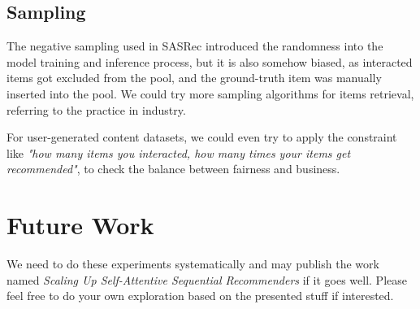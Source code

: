 \documentclass{article}
\begin{document}




\subsection{Sampling}

The negative sampling used in SASRec introduced the randomness into the model training and inference process,
but it is also somehow biased,
as interacted items got excluded from the pool,
and the ground-truth item was manually inserted into the pool.
We could try more sampling algorithms for items retrieval,
referring to the practice in industry.

For user-generated content datasets, 
we could even try to apply the constraint
like \emph{"how many items you interacted,
how many times your items get recommended"},
to check the balance between fairness and business.









\section{Future Work}

We need to do these experiments systematically
and may publish the work named \emph{Scaling Up Self-Attentive Sequential Recommenders} if it goes well.
Please feel free to do your own exploration based on
the presented stuff if interested.


  

\end{document}
